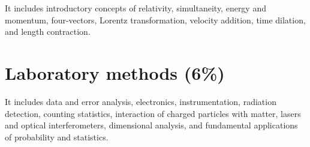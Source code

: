 \documentclass[12pt,a4paper]{article}
\begin{document}
\quad It includes introductory concepts of relativity, simultaneity, energy and momentum, four-vectors, Lorentz transformation, velocity addition, time dilation, and length contraction.

\section{Laboratory methods (6\%)}

\quad It includes data and error analysis, electronics, instrumentation, radiation detection, counting statistics, interaction of charged particles with matter, lasers and optical interferometers, dimensional analysis, and fundamental applications of probability and statistics.
\end{document}
